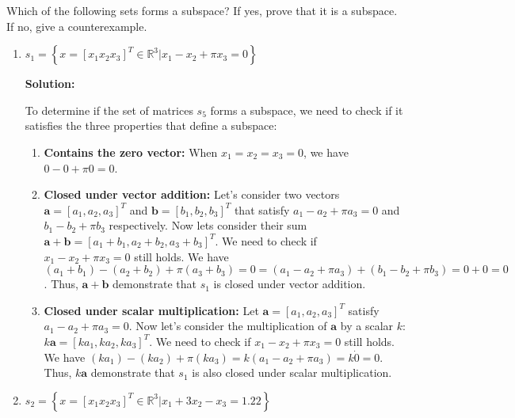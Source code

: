 Which of the following sets forms a subspace? If yes, prove that it is a
subspace. If no, give a counterexample.
\begin{enumerate}[label=(\alph*)]
	\item
	      $s_{1} =
		      \left\{
		      x=\left[x_{1}x_{2}x_{3}\right]^T \in \mathbb{R}^3 | x_1 - x_2 +
		      \pi x_3 = 0
		      \right\}$

	      \par \textbf{Solution:}
	      \par To determine if the set of matrices $s_5$ forms a subspace, we need
	      to check if it satisfies the three properties that define a subspace:
	      \begin{enumerate}[label=\roman*.]
		      \item \textbf{Contains the zero vector:}
		            When $x_1 = x_2 = x_3 = 0$, we have
		            $0 - 0 + \pi 0 = 0$.
		      \item \textbf{Closed under vector addition:}
		            Let's consider two vectors
		            $\mathbf{a} = \left[ a_1, a_2, a_3\right]^T$ and $\mathbf{b} = \left[ b_1, b_2,
				            b_3\right]^T$ that satisfy $a_1 - a_2 + \pi a_3 = 0$ and $b_1 -
			            b_2 + \pi b_3$ respectively. Now lets consider their sum
		            $\mathbf{a} + \mathbf{b} = \left[ a_1 + b_1, a_2 + b_2, a_3 +
				            b_3\right]^T$. We need to check if $x_1 - x_2 + \pi x_3 = 0$ still
		            holds. We have $(a_1 + b_1) - (a_2 + b_2) + \pi(a_3 + b_3) =
			            0 = (a_1 - a_2 + \pi a_3) + (b_1 - b_2 + \pi b_3) = 0 + 0 = 0$.
		            Thus, $\mathbf{a} + \mathbf{b}$ demonstrate that $s_1$ is closed
		            under vector addition.
		      \item \textbf{Closed under scalar multiplication:}
		            Let
		            $\mathbf{a} = \left[ a_1, a_2, a_3\right]^T$ satisfy $a_1 - a_2 + \pi
			            a_3 = 0$.
		            Now let's consider the multiplication of $\mathbf{a}$ by a scalar $k$:
		            $k\mathbf{a} = \left[ ka_1, ka_2, ka_3\right]^T$. We need to check if
		            $x_1 - x_2 + \pi x_3 = 0$ still holds. We have $(ka_1) - (ka_2) +
			            \pi(ka_3) = k(a_1 - a_2 + \pi a_3) = k \dot 0 = 0$. Thus,
		            $k\mathbf{a}$ demonstrate that $s_1$ is also closed under scalar
		            multiplication.
	      \end{enumerate}

	\item
	      $s_{2} =
		      \left\{
		      x=\left[x_{1}x_{2}x_{3}\right]^T \in \mathbb{R}^3 | x_1 + 3x_2 -
		      x_3 = 1.22
		      \right\}$


\end{enumerate}
